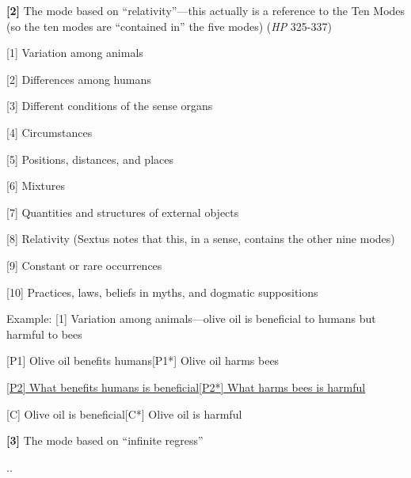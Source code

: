 \documentclass[11pt]{article}
\begin{document}
\noindent \textbf{[2]} The mode based on ``relativity''---this actually is a reference to the Ten Modes (so the ten modes are ``contained in'' the five modes) (\emph{HP} 325-337)
\vspace*{2mm}

[1] Variation among animals
\vspace*{1mm}

[2] Differences among humans
\vspace*{1mm}

[3] Different conditions of the sense organs
\vspace*{1mm}

[4] Circumstances
\vspace*{1mm}

[5] Positions, distances, and places
\vspace*{1mm}

[6] Mixtures
\vspace*{1mm}

[7] Quantities and structures of external objects
\vspace*{1mm}

[8] Relativity (Sextus notes that this, in a sense, contains the other nine modes)
\vspace*{1mm}

[9] Constant or rare occurrences
\vspace*{1mm}

[10] Practices, laws, beliefs in myths, and dogmatic suppositions
\vspace*{2mm}

\noindent Example: [1] Variation among animals---olive oil is beneficial to humans but harmful to bees
\vspace*{2mm}

[P1] Olive oil benefits humans\hspace*{44.5mm}[P1*] Olive oil harms bees
\vspace*{1mm}

\underline{[P2] What benefits humans is beneficial}\hspace*{30mm}\underline{[P2*] What harms bees is harmful}
\vspace*{1mm}

[C] Olive oil is beneficial\hspace*{53mm}[C*] Olive oil is harmful
\newpage

\noindent \textbf{[3]} The mode based on ``infinite regress''
\vspace*{2mm}

\hspace*{2.5mm}.\hspace*{40mm}.
\vspace*{1mm}
\end{document}
